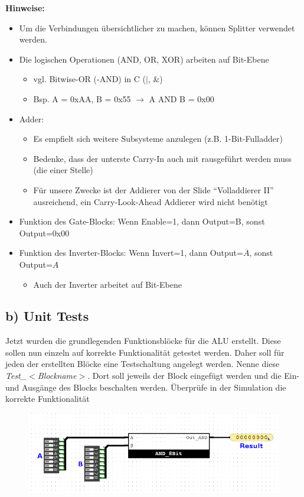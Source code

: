 \documentclass[a4paper]{scrartcl}
\begin{document}
\textbf{Hinweise:}
\begin{itemize}
  \item Um die Verbindungen übersichtlicher zu machen, können Splitter verwendet werden.
  \item Die logischen Operationen (AND, OR, XOR) arbeiten auf Bit-Ebene  
  \begin{itemize}
    \item vgl. Bitwise-OR (-AND) in C ($\vert$, \&)
    \item Bsp. A = 0xAA, B = 0x55 $\rightarrow$ A AND B = 0x00
  \end{itemize}
  \item Adder:
  \begin{itemize}
    \item Es empfielt sich weitere Subsysteme anzulegen (z.B. 1-Bit-Fulladder)
    \item Bedenke, dass der unterste Carry-In auch mit rausgeführt werden muss (die einer Stelle)
    \item Für unsere Zwecke ist der Addierer von der Slide ``Volladdierer II'' ausreichend, ein Carry-Look-Ahead Addierer wird nicht benötigt 
  \end{itemize}
  \item Funktion des Gate-Blocks: Wenn Enable=1, dann Output=B, sonst Output=0x00 
  \item Funktion des Inverter-Blocks: Wenn Invert=1, dann Output=$\overline{A}$, sonst Output=$A$
  \begin{itemize}
    \item Auch der Inverter arbeitet auf Bit-Ebene
  \end{itemize}
\end{itemize}

\subsection*{b) Unit Tests}
Jetzt wurden die grundlegenden Funktionsblöcke für die ALU erstellt. Diese sollen nun einzeln auf korrekte Funktionalität getestet werden.
Daher soll für jeden der erstellten Blöcke eine Testschaltung angelegt werden. Nenne diese \textit{Test\_$<$Blockname$>$}.
Dort soll jeweils der Block eingefügt werden und die Ein- und Ausgänge des Blocks beschalten werden. Überprüfe in der Simulation 
die korrekte Funktionalität

\begin{figure}[h]
  \centering
  \includegraphics[width=12cm]{Test_Circuit.png}
\end{figure}
\end{document}
